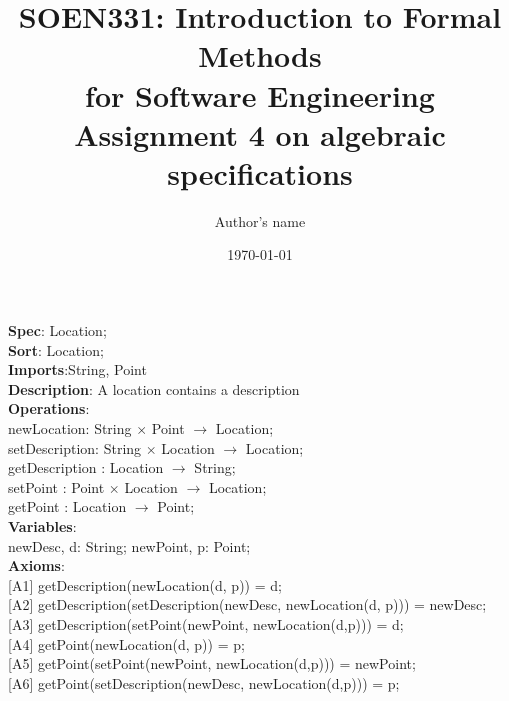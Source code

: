 \documentclass[12pt]{article}
\title{SOEN331: Introduction to Formal Methods\\for Software Engineering\\
Assignment 4 on algebraic specifications}
\author{Author's name}
\date{\today}
\begin{document}
\begin{spacing}{1.5}

\maketitle

\noindent \textbf{Spec}: Location;\\
\noindent \textbf{Sort}: Location;\\
\noindent \textbf{Imports}:String, Point\\
\noindent \textbf{Description}: A location contains a description \\
\noindent \textbf{Operations}:\\
\hspace*{5mm} newLocation: String $\times$ Point $\rightarrow$ Location;\\
\hspace*{5mm} setDescription: String $\times$ Location $\rightarrow$ Location;\\
\hspace*{5mm} getDescription : Location $\rightarrow$ String;\\
\hspace*{5mm} setPoint : Point $\times$ Location $\rightarrow$ Location;\\
\hspace*{5mm} getPoint : Location $\rightarrow$ Point;\\
\noindent \textbf{Variables}:\\
\hspace*{5mm} newDesc, d: String; newPoint, p: Point;\\
\noindent \textbf{Axioms}:\\
\hspace*{5mm} [A1] getDescription(newLocation(d, p)) = d;\\
\hspace*{5mm} [A2] getDescription(setDescription(newDesc, newLocation(d, p))) = newDesc;\\
\hspace*{5mm} [A3] getDescription(setPoint(newPoint, newLocation(d,p))) = d;\\
\hspace*{5mm} [A4] getPoint(newLocation(d, p)) = p;\\
\hspace*{5mm} [A5] getPoint(setPoint(newPoint, newLocation(d,p))) = newPoint;\\
\hspace*{5mm} [A6] getPoint(setDescription(newDesc, newLocation(d,p))) = p;\\

\end{spacing}
\end{document}
